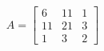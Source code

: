 \documentclass[preview]{standalone}
\begin{document}
\begin{align*}
A=\left[\begin{matrix}6&11&1\\11&21&3\\1&3&2\end{matrix}\right]
\end{align*}
\end{document}
